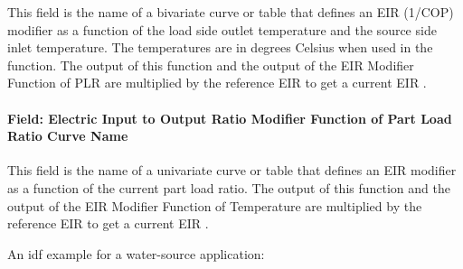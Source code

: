 This field is the name of a bivariate curve or table that defines an EIR (1/COP) modifier as a function of the load side outlet temperature and the source side inlet temperature. The temperatures are in degrees Celsius when used in the function. The output of this function and the output of the EIR Modifier Function of PLR are multiplied by the reference EIR to get a current EIR .

\paragraph{Field: Electric Input to Output Ratio Modifier Function of Part Load Ratio Curve Name}\label{plhp_eir_inputs_eirfplr}

This field is the name of a univariate curve or table that defines an EIR modifier as a function of the current part load ratio. The output of this function and the output of the EIR Modifier Function of Temperature are multiplied by the reference EIR to get a current EIR .

An idf example for a water-source application:

